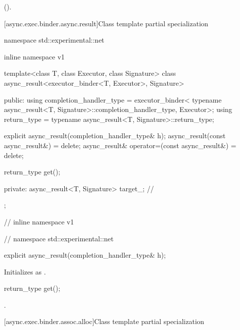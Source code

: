 \begin{itemdescr}
\pnum
\returns {} ().
\end{itemdescr}



[async.exec.binder.async.result]{Class template partial specialization }

%
%
\begin{codeblock}
namespace std::experimental::net {
inline namespace v1 {

  template<class T, class Executor, class Signature>
  class async_result<executor_binder<T, Executor>, Signature>
  {
  public:
    using completion_handler_type = executor_binder<
      typename async_result<T, Signature>::completion_handler_type,
        Executor>;
    using return_type = typename async_result<T, Signature>::return_type;

    explicit async_result(completion_handler_type& h);
    async_result(const async_result&) = delete;
    async_result& operator=(const async_result&) = delete;

    return_type get();

  private:
    async_result<T, Signature> target_; // \expos
  };

} // inline namespace v1
} // namespace std::experimental::net
\end{codeblock}

\begin{itemdecl}
explicit async_result(completion_handler_type& h);
\end{itemdecl}

\begin{itemdescr}
\pnum
\effects Initializes  as .
\end{itemdescr}

\begin{itemdecl}
return_type get();
\end{itemdecl}

\begin{itemdescr}
\pnum
\returns {}.
\end{itemdescr}



[async.exec.binder.assoc.alloc]{Class template partial specialization }

